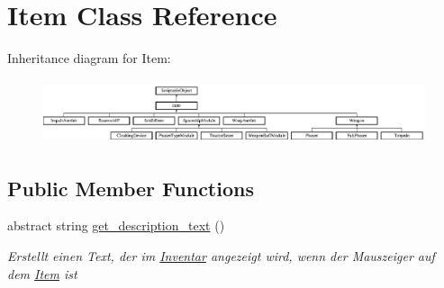\hypertarget{class_item}{}\section{Item Class Reference}
\label{class_item}
Inheritance diagram for Item\+:\begin{figure}[H]
\begin{center}
\leavevmode
\includegraphics[height=1.899915cm]{class_item}
\end{center}
\end{figure}
\subsection*{Public Member Functions}
\begin{DoxyCompactItemize}
\item 
abstract string \hyperlink{class_item_ab868f8ccad92378f7352e3a9e0f755ff}{get\+\_\+description\+\_\+text} ()
\begin{DoxyCompactList}\small\item\em Erstellt einen Text, der im \hyperlink{class_inventar}{Inventar} angezeigt wird, wenn der Mauszeiger auf dem \hyperlink{class_item}{Item} ist \end{DoxyCompactList}\end{DoxyCompactItemize}

